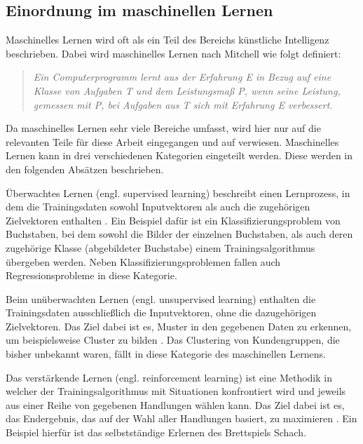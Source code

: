 \subsection{Einordnung im maschinellen Lernen}
\label{grundlagen_nn_ml}

Maschinelles Lernen wird oft als ein Teil des Bereichs künstliche Intelligenz beschrieben. Dabei wird maschinelles Lernen nach Mitchell \cite{mitchell1997machine} wie folgt definiert:

\begin{quote}
\textit{\glqq Ein Computerprogramm lernt aus der Erfahrung E in Bezug auf eine Klasse von Aufgaben T und dem Leistungsmaß P, wenn seine Leistung, gemessen mit P, bei Aufgaben aus T sich mit Erfahrung E verbessert.\grqq}
\end{quote}

Da maschinelles Lernen sehr viele Bereiche umfasst, wird hier nur auf die relevanten Teile für diese Arbeit eingegangen und auf \cite{mitchell1997machine} verwiesen. Maschinelles Lernen kann in drei verschiedenen Kategorien eingeteilt werden. Diese werden in den folgenden Absätzen beschrieben.

Überwachtes Lernen (engl. supervised learning) beschreibt einen Lernprozess, in dem die Trainingsdaten sowohl Inputvektoren als auch die zugehörigen Zielvektoren enthalten \cite{bishop2006pattern}. Ein Beispiel dafür ist ein Klassifizierungsproblem von Buchstaben, bei dem sowohl die Bilder der einzelnen Buchstaben, als auch deren zugehörige Klasse (abgebildeter Buchstabe) einem Trainingsalgorithmus übergeben werden. Neben Klassifizierungsproblemen fallen auch Regressionsprobleme in diese Kategorie.

Beim unüberwachten Lernen (engl. unsupervised learning) enthalten die Trainingsdaten ausschließlich die Inputvektoren, ohne die dazugehörigen Zielvektoren. Das Ziel dabei ist es, Muster in den gegebenen Daten zu erkennen, um beispielsweise Cluster zu bilden \cite{bishop2006pattern}. Das Clustering von Kundengruppen, die bisher unbekannt waren, fällt in diese Kategorie des maschinellen Lernens.

Das verstärkende Lernen (engl. reinforcement learning) ist eine Methodik in welcher der Trainingsalgorithmus mit Situationen konfrontiert wird und jeweils aus einer Reihe von gegebenen Handlungen wählen kann. Das Ziel dabei ist es, das Endergebnis, das auf der Wahl aller Handlungen basiert, zu maximieren \cite{sutton1998introduction}. Ein Beispiel hierfür ist das selbstständige Erlernen des Brettspiels Schach.


